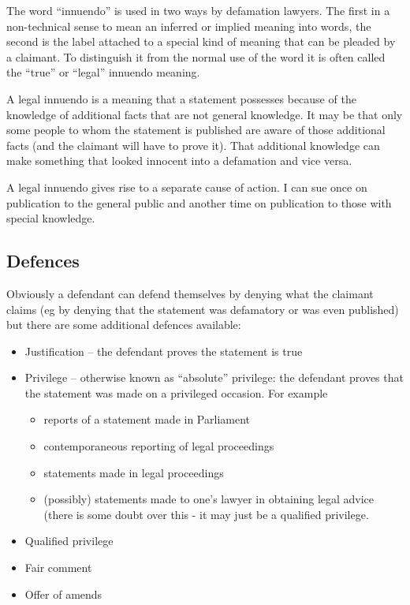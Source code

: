 \documentclass[]{article}
\begin{document}
The word ``innuendo'' is used in two ways by defamation lawyers. The
first in a non-technical sense to mean an inferred or implied meaning
into words, the second is the label attached to a special kind of
meaning that can be pleaded by a claimant. To distinguish it from the
normal use of the word it is often called the ``true'' or ``legal''
innuendo meaning.

A legal innuendo is a meaning that a statement possesses because of the
knowledge of additional facts that are not general knowledge. It may be
that only some people to whom the statement is published are aware of
those additional facts (and the claimant will have to prove it). That
additional knowledge can make something that looked innocent into a
defamation and vice versa.

A legal innuendo gives rise to a separate cause of action. I can sue
once on publication to the general public and another time on
publication to those with special knowledge.

\subsection{Defences}

Obviously a defendant can defend themselves by denying what the claimant
claims (eg by denying that the statement was defamatory or was even
published) but there are some additional defences available:

\begin{itemize}
\item
  Justification -- the defendant proves the statement is true
\item
  Privilege -- otherwise known as ``absolute'' privilege: the defendant
  proves that the statement was made on a privileged occasion. For
  example

  \begin{itemize}
  \item
    reports of a statement made in Parliament
  \item
    contemporaneous reporting of legal proceedings
  \item
    statements made in legal proceedings
  \item
    (possibly) statements made to one's lawyer in obtaining legal advice
    (there is some doubt over this - it may just be a qualified
    privilege.
  \end{itemize}
\item
  Qualified privilege
\item
  Fair comment
\item
  Offer of amends
\end{itemize}
\end{document}
